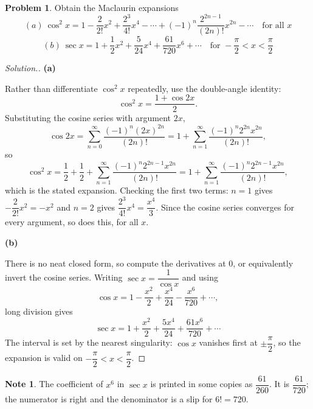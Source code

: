 \documentclass[11pt,a4paper]{article}
\theoremstyle{definition}
\newtheorem*{note}{Note}
\newtheorem{problemx}{Problem}[subsection]
\newenvironment{problem}{\begin{problemx}}{\end{problemx}}
\newenvironment{solution}
  {\renewcommand{\qedsymbol}{}\begin{proof}[\textit{Solution}.]}
  {\end{proof}}
\newcommand{\subhead}[1]{%
  \par\medskip\noindent\textbf{#1}\par\nobreak\smallskip}
\begin{document}
\begin{problem}
Obtain the Maclaurin expansions
$$(a)\ \cos^2x = 1 - \frac{2}{2!}x^2 + \frac{2^3}{4!}x^4 - \cdots
+ (-1)^n\frac{2^{2n-1}}{(2n)!}x^{2n} - \cdots\quad\text{for all }x$$
$$(b)\ \sec x = 1 + \frac12x^2 + \frac{5}{24}x^4 + \frac{61}{720}x^6 + \cdots
\quad\text{for } -\frac{\pi}{2}<x<\frac{\pi}{2}$$
\end{problem}
\begin{solution}
\subhead{(a)}
Rather than differentiate $\cos^2x$ repeatedly, use the double-angle identity:
$$\cos^2x = \frac{1+\cos 2x}{2}.$$
Substituting the cosine series with argument $2x$,
$$\cos 2x = \sum_{n=0}^{\infty}\frac{(-1)^n(2x)^{2n}}{(2n)!}
= 1 + \sum_{n=1}^{\infty}\frac{(-1)^n2^{2n}x^{2n}}{(2n)!},$$
so
$$\cos^2x = \frac12 + \frac12 + \sum_{n=1}^{\infty}
\frac{(-1)^n2^{2n-1}x^{2n}}{(2n)!}
= 1 + \sum_{n=1}^{\infty}\frac{(-1)^n2^{2n-1}x^{2n}}{(2n)!},$$
which is the stated expansion. Checking the first two terms:
$n=1$ gives $-\dfrac{2}{2!}x^2 = -x^2$ and $n=2$ gives
$\dfrac{2^3}{4!}x^4 = \dfrac{x^4}{3}$. Since the cosine series converges for
every argument, so does this, for all $x$.

\subhead{(b)}
There is no neat closed form, so compute the derivatives at $0$, or equivalently
invert the cosine series. Writing $\sec x = \dfrac{1}{\cos x}$ and using
$$\cos x = 1 - \frac{x^2}{2} + \frac{x^4}{24} - \frac{x^6}{720} + \cdots ,$$
long division gives
$$\sec x = 1 + \frac{x^2}{2} + \frac{5x^4}{24} + \frac{61x^6}{720} + \cdots$$
The interval is set by the nearest singularity: $\cos x$ vanishes first at
$\pm\dfrac{\pi}{2}$, so the expansion is valid on
$-\dfrac{\pi}{2}<x<\dfrac{\pi}{2}$.
\end{solution}

\begin{note}
The coefficient of $x^6$ in $\sec x$ is printed in some copies as
$\dfrac{61}{260}$. It is $\dfrac{61}{720}$; the numerator is right and the
denominator is a slip for $6! = 720$.
\end{note}
\end{document}
